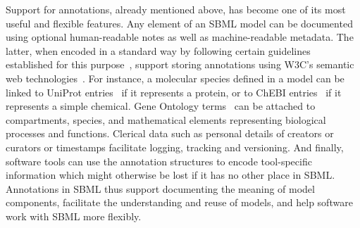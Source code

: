 \documentclass[]{draft-sbml-paper}
\begin{document}
Support for annotations, already mentioned above, has become one of its most useful and flexible features.  Any element of an SBML model can be documented using optional human-readable notes as well as machine-readable metadata.  The latter, when encoded in a standard way by following certain guidelines established for this purpose~\citep{le_novere_2005}, support storing annotations using W3C's semantic web technologies~\citep{lassila_resource_1999}.  For instance, a molecular species defined in a model can be linked to UniProt entries~\citep{uniprot2017} if it represents a protein, or to ChEBI entries~\citep{hastings2013chebi} if it represents a simple chemical.  Gene Ontology terms~\citep{ashburner2000gene} can be attached to compartments, species, and mathematical elements representing biological processes and functions. Clerical data such as personal details of creators or curators or timestamps facilitate logging, tracking and versioning.  And finally, software tools can use the annotation structures to encode tool-specific information which might otherwise be lost if it has no other place in SBML.  Annotations in SBML thus support documenting the meaning of model components, facilitate the understanding and reuse of models, and help software work with SBML more flexibly.
\end{document}
